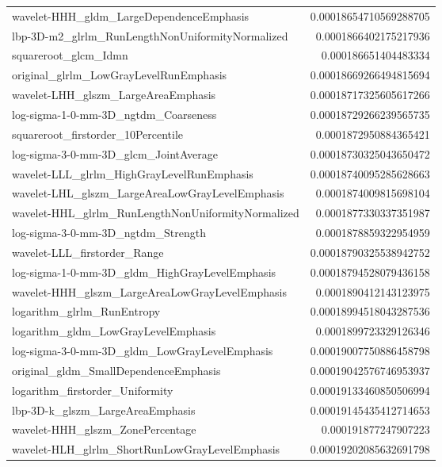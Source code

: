 {\begin{xltabular}[H]{\textwidth}{X r}
        wavelet-HHH\_gldm\_LargeDependenceEmphasis & 0.00018654710569288705 \\
        lbp-3D-m2\_glrlm\_RunLengthNonUniformityNormalized & 0.0001866402175217936 \\
        squareroot\_glcm\_Idmn & 0.000186651404483334 \\
        original\_glrlm\_LowGrayLevelRunEmphasis & 0.00018669266494815694 \\
        wavelet-LHH\_glszm\_LargeAreaEmphasis & 0.00018717325605617266 \\
        log-sigma-1-0-mm-3D\_ngtdm\_Coarseness & 0.00018729266239565735 \\
        squareroot\_firstorder\_10Percentile & 0.0001872950884365421 \\
        log-sigma-3-0-mm-3D\_glcm\_JointAverage & 0.00018730325043650472 \\
        wavelet-LLL\_glrlm\_HighGrayLevelRunEmphasis & 0.00018740095285628663 \\
        wavelet-LHL\_glszm\_LargeAreaLowGrayLevelEmphasis & 0.0001874009815698104 \\
        wavelet-HHL\_glrlm\_RunLengthNonUniformityNormalized & 0.0001877330337351987 \\
        log-sigma-3-0-mm-3D\_ngtdm\_Strength & 0.0001878859322954959 \\
        wavelet-LLL\_firstorder\_Range & 0.00018790325538942752 \\
        log-sigma-1-0-mm-3D\_gldm\_HighGrayLevelEmphasis & 0.00018794528079436158 \\
        wavelet-HHH\_glszm\_LargeAreaLowGrayLevelEmphasis & 0.0001890412143123975 \\
        logarithm\_glrlm\_RunEntropy & 0.00018994518043287536 \\
        logarithm\_gldm\_LowGrayLevelEmphasis & 0.0001899723329126346 \\
        log-sigma-3-0-mm-3D\_gldm\_LowGrayLevelEmphasis & 0.00019007750886458798 \\
        original\_gldm\_SmallDependenceEmphasis & 0.00019042576746953937 \\
        logarithm\_firstorder\_Uniformity & 0.00019133460850506994 \\
        lbp-3D-k\_glszm\_LargeAreaEmphasis & 0.00019145435412714653 \\
        wavelet-HHH\_glszm\_ZonePercentage & 0.000191877247907223 \\
        wavelet-HLH\_glrlm\_ShortRunLowGrayLevelEmphasis & 0.00019202085632691798 \\

\end{xltabular}}
